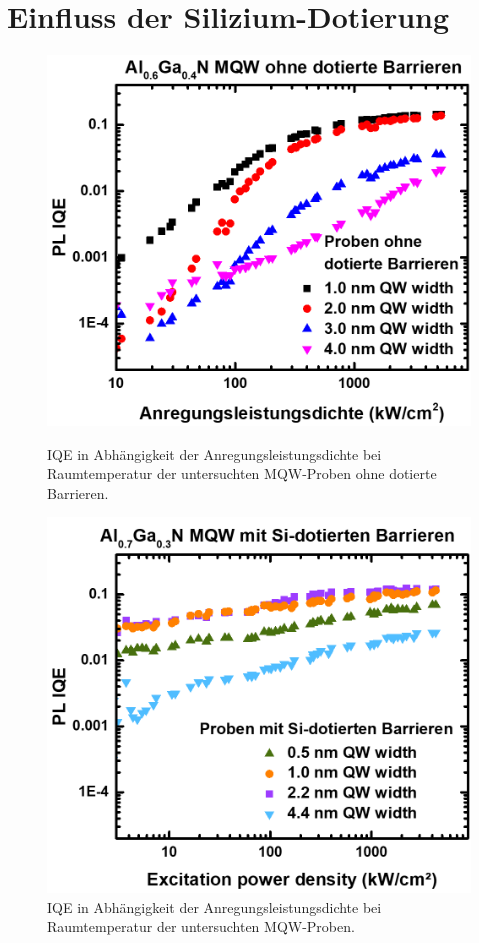 \section{Einfluss der Silizium-Dotierung}
%
\begin{figure}[H]
  \centering
  \begin{minipage}[t]{0.49\textwidth}
    \centering
    \includegraphics[width=\textwidth]{Bilder/MQWdickenSerie/IQEundotiert.png}
		\caption{IQE in Abhängigkeit der Anregungsleistungsdichte bei Raumtemperatur der untersuchten MQW-Proben ohne dotierte Barrieren.}
    \label{fig:undotiertIQE}
  \end{minipage}
	\hfill
  \begin{minipage}[t]{0.49\textwidth}
    \centering
    \includegraphics[width=\linewidth]{Bilder/MQWdickenSerie/IQEdotiert.png}
		\caption{IQE in Abhängigkeit der Anregungsleistungsdichte bei Raumtemperatur der untersuchten MQW-Proben.}
    \label{fig:dotiertIQE}
  \end{minipage}
\end{figure}
